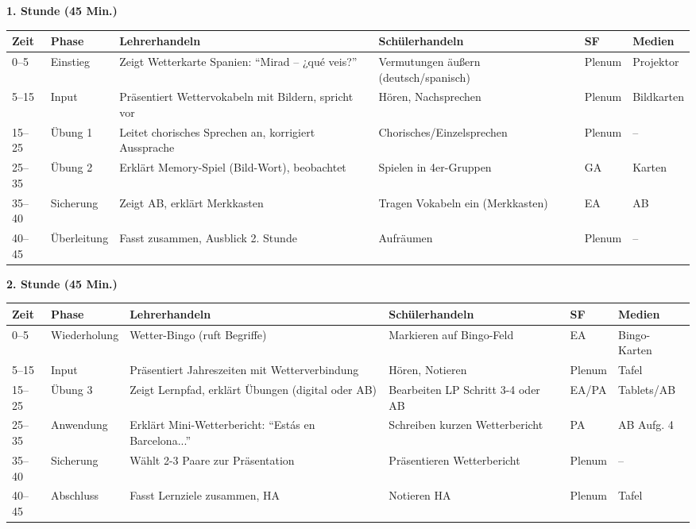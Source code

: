 \documentclass[11pt,a4paper]{article}
\begin{document}
\textbf{1. Stunde (45 Min.)}

\begin{longtable}{|p{1cm}|p{1.5cm}|p{4cm}|p{3cm}|p{2cm}|p{2cm}|}
\hline
\textbf{Zeit} & \textbf{Phase} & \textbf{Lehrerhandeln} & \textbf{Schülerhandeln} & \textbf{SF} & \textbf{Medien} \\
\hline
\endhead

0--5 & Einstieg & Zeigt Wetterkarte Spanien: ``Mirad -- ¿qué veis?'' & Vermutungen äußern (deutsch/spanisch) & Plenum & Projektor \\
\hline

5--15 & Input & Präsentiert Wettervokabeln mit Bildern, spricht vor & Hören, Nachsprechen & Plenum & Bildkarten \\
\hline

15--25 & Übung 1 & Leitet chorisches Sprechen an, korrigiert Aussprache & Chorisches/Einzelsprechen & Plenum & -- \\
\hline

25--35 & Übung 2 & Erklärt Memory-Spiel (Bild-Wort), beobachtet & Spielen in 4er-Gruppen & GA & Karten \\
\hline

35--40 & Sicherung & Zeigt AB, erklärt Merkkasten & Tragen Vokabeln ein (Merkkasten) & EA & AB \\
\hline

40--45 & Über\-leitung & Fasst zusammen, Ausblick 2. Stunde & Aufräumen & Plenum & -- \\
\hline
\end{longtable}

\vspace{1em}

\textbf{2. Stunde (45 Min.)}

\begin{longtable}{|p{1cm}|p{1.5cm}|p{4cm}|p{3cm}|p{2cm}|p{2cm}|}
\hline
\textbf{Zeit} & \textbf{Phase} & \textbf{Lehrerhandeln} & \textbf{Schülerhandeln} & \textbf{SF} & \textbf{Medien} \\
\hline
\endhead

0--5 & Wieder\-holung & Wetter-Bingo (ruft Begriffe) & Markieren auf Bingo-Feld & EA & Bingo-Karten \\
\hline

5--15 & Input & Präsentiert Jahreszeiten mit Wetterverbindung & Hören, Notieren & Plenum & Tafel \\
\hline

15--25 & Übung 3 & Zeigt Lernpfad, erklärt Übungen (digital oder AB) & Bearbeiten LP Schritt 3-4 oder AB & EA/PA & Tablets/AB \\
\hline

25--35 & Anwen\-dung & Erklärt Mini-Wetterbericht: ``Estás en Barcelona...'' & Schreiben kurzen Wetterbericht & PA & AB Aufg. 4 \\
\hline

35--40 & Sicherung & Wählt 2-3 Paare zur Präsentation & Präsentieren Wetterbericht & Plenum & -- \\
\hline

40--45 & Abschluss & Fasst Lernziele zusammen, HA & Notieren HA & Plenum & Tafel \\
\hline
\end{longtable}
\end{document}
